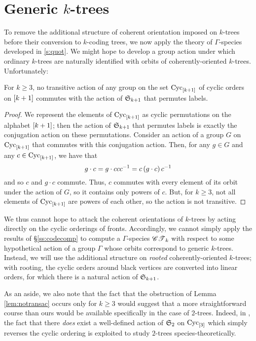 \documentclass[sectionflow,singlespace,twoside,boldmathhdr,draft]{brandiss} %
\numberwithin{section}{chapter}
\numberwithin{figure}{chapter}
\begin{document}
\section{Generic $k$-trees}\label{s:genkt}
To remove the additional structure of coherent orientation imposed on $k$-trees before their conversion to $k$-coding trees, we now apply the theory of $\Gamma$-species developed in \ref{s:quot}.
We might hope to develop a group action under which ordinary $k$-trees are naturally identified with orbits of coherently-oriented $k$-trees.
Unfortunately:
\begin{lemma}
  \label{lem:notransac}
  For $k \geq 3$, no transitive action of any group on the set $\operatorname{Cyc}_{\left[ {k+1} \right]}$ of cyclic orders on $\left[ {k+1} \right]$ commutes with the action of $ \mathfrak{S}_{k+1} $ that permutes labels.
\end{lemma}
\begin{proof}
  We represent the elements of $\operatorname{Cyc}_{\left[ {k+1} \right]}$ as cyclic permutations on the alphabet $\left[ {k+1} \right]$; then the action of $ \mathfrak{S}_{k+1} $ that permutes labels is exactly the conjugation action on these permutations.
  Consider an action of a group $G$ on $\operatorname{Cyc}_{\left[ {k+1} \right]}$ that commutes with this conjugation action.
  Then, for any $g \in G$ and any $c \in \operatorname{Cyc}_{\left[ {k+1} \right]}$, we have that
  \begin{equation}
    \label{eq:transaction}
    g \cdot c = g \cdot c c c^{-1} = c \left( {g \cdot c} \right) c^{-1}
  \end{equation}
  and so $c$ and $g \cdot c$ commute.
  Thus, $c$ commutes with every element of its orbit under the action of $G$, so it contains only powers of $c$.
  But, for $k \geq 3$, not all elements of $\operatorname{Cyc}_{\left[ {k+1} \right]}$ are powers of each other, so the action is not transitive.
\end{proof}

We thus cannot hope to attack the coherent orientations of $k$-trees by acting directly on the cyclic orderings of fronts.
Accordingly, we cannot simply apply the results of \S \ref{ss:codecomp} to compute a $\Gamma$-species $\mathscr{CT}_{k}$ with respect to some hypothetical action of a group $\Gamma$ whose orbits correspond to generic $k$-trees.
Instead, we will use the additional structure on \emph{rooted} coherently-oriented $k$-trees; with rooting, the cyclic orders around black vertices are converted into linear orders, for which there is a natural action of $ \mathfrak{S}_{k+1} $.

As an aside, we also note that the fact that the obstruction of Lemma \ref{lem:notransac} occurs only for $k \geq 3$ would suggest that a more straightforward course than ours would be available specifically in the case of $2$-trees.
Indeed, in \cite{gessel:spec2trees}, the fact that there \emph{does} exist a well-defined action of $ \mathfrak{S}_{2} $ on $\operatorname{Cyc}_{\left[ {3} \right]}$ which simply reverses the cyclic ordering is exploited to study $2$-trees species-theoretically.
\end{document}
